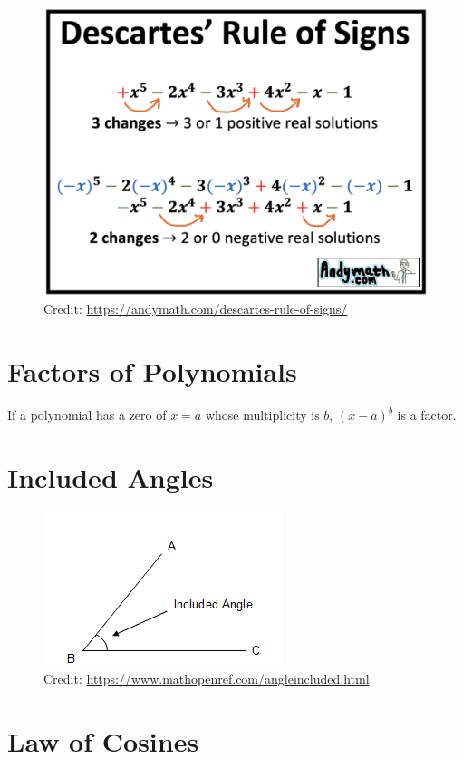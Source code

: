 \documentclass[12pt]{article}
\begin{document}
\begin{figure}[H]
	\centering
	\includegraphics[scale=0.3]{drs2.png}
	\caption{Credit: \url{https://andymath.com/descartes-rule-of-signs/}}
\end{figure}

\section{Factors of Polynomials}

If a polynomial has a zero of \(x=a\) whose multiplicity is \(b\), \((x-a)^b\) is a factor.

\section{Included Angles}

\begin{figure}[H]
	\centering
	\includegraphics[scale=1]{included.gif}
	\caption{Credit: \url{https://www.mathopenref.com/angleincluded.html}}
\end{figure}

\section{Law of Cosines}
\end{document}
